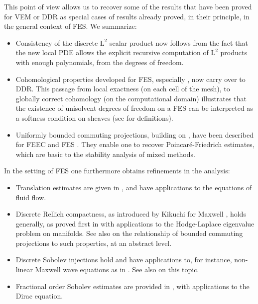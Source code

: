 \documentclass[10pt,a4paper]{article}
\newcommand{\rmL}{\mathrm{L}}
\theoremstyle{remark}
\theoremstyle{definition}
\numberwithin{equation}{section}
\begin{document}
This point of view allows us to recover some of the results that have been proved for VEM or DDR %
as special cases of results already proved, in their principle, in the general context of FES.  We summarize:
\begin{itemize}
\item Consistency of the discrete $\rmL^2$ scalar product now follows from the fact that the new local PDE allows the explicit recursive computation of $\rmL^2$ products with enough polynomials, from the degrees of freedom.
\item Cohomological properties developed for FES, especially \cite[Proposition 5.15]{ChrMunOwr11}, now carry over to DDR. This passage from local exactness (on each cell of the mesh), to globally correct cohomology (on the computational domain) illustrates that the existence of unisolvent degrees of freedom on a FES can be interpreted as a softness condition on sheaves (see \cite[\S III.2]{Ive86} for definitions).
\item Uniformly bounded commuting projections, building on \cite{Sch08, Chr07NM}, have been described for FEEC \cite{ArnFalWin06,ChrWin08} and FES \cite[\S 5.3]{ChrMunOwr11}. They enable one to recover Poincaré-Friedrich estimates, which are basic to the stability analysis of mixed methods.
\end{itemize}
In the setting of FES one furthermore obtains refinements in the analysis:
\begin{itemize}
\item Translation estimates are given in \cite[Proposition 5.71]{ChrMunOwr11}, and have applications to the equations of fluid flow.
\item Discrete Rellich compactness, as introduced by Kikuchi for Maxwell \cite[\S IV.19]{Bof10}, holds generally, as proved first in \cite[Corollary 5]{Chr07NM} with applications to the Hodge-Laplace eigenvalue problem on manifolds. See also \cite{ChrWin13IMA} on the relationship of bounded commuting projections to such properties, at an abstract level.
\item Discrete Sobolev injections hold \cite[Propositions 5.69, 5.70]{ChrMunOwr11} and have applications to, for instance, non-linear Maxwell wave equations as in \cite{ChrSch11}. See also \cite{HeHuXu19} on this topic.
\item Fractional order Sobolev estimates are provided in \cite{Chr18}, with applications to the Dirac equation.
\end{itemize}
\end{document}
